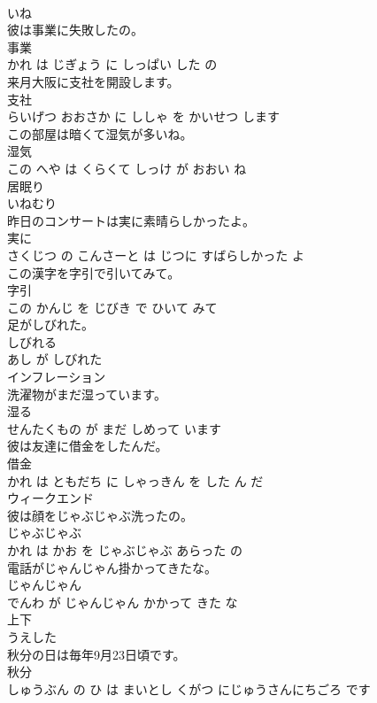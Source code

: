\documentclass[8pt]{extreport}
\begin{document}
\begin{CJK}{UTF8}{min}
\\	いね		
\\	彼は事業に失敗したの。	
\\	事業 
\\	かれ は じぎょう に しっぱい した の			
\\	来月大阪に支社を開設します。	
\\	支社 
\\	らいげつ おおさか に ししゃ を かいせつ します			
\\	この部屋は暗くて湿気が多いね。	
\\	湿気 
\\	この へや は くらくて しっけ が おおい ね			
\\	居眠り	
\\	いねむり		
\\	昨日のコンサートは実に素晴らしかったよ。	
\\	実に 
\\	さくじつ の こんさーと は じつに すばらしかった よ			
\\	この漢字を字引で引いてみて。	
\\	字引 
\\	この かんじ を じびき で ひいて みて			
\\	足がしびれた。	
\\	しびれる 
\\	あし が しびれた			
\\	インフレーション	
\\	洗濯物がまだ湿っています。	
\\	湿る 
\\	せんたくもの が まだ しめって います			
\\	彼は友達に借金をしたんだ。	
\\	借金 
\\	かれ は ともだち に しゃっきん を した ん だ			
\\	ウィークエンド	
\\	彼は顔をじゃぶじゃぶ洗ったの。	
\\	じゃぶじゃぶ 
\\	かれ は かお を じゃぶじゃぶ あらった の			
\\	電話がじゃんじゃん掛かってきたな。	
\\	じゃんじゃん 
\\	でんわ が じゃんじゃん かかって きた な			
\\	上下	
\\	うえした		
\\	秋分の日は毎年9月23日頃です。	
\\	秋分 
\\	しゅうぶん の ひ は まいとし くがつ にじゅうさんにちごろ です			

\end{CJK}
\end{document}
